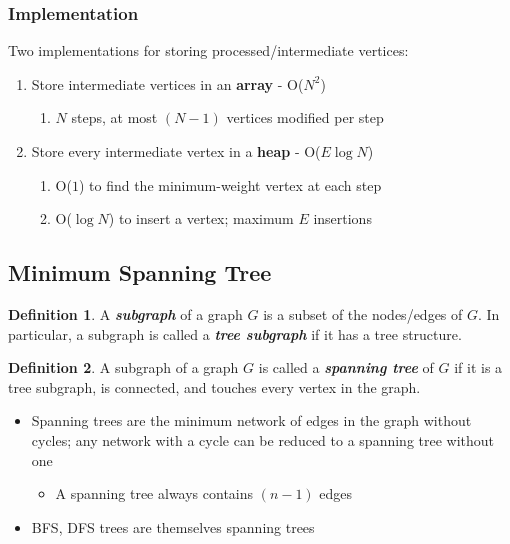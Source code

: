 \documentclass[12pt]{extarticle}
\theoremstyle{definition}
\newtheorem*{definition}{Definition}
\theoremstyle{remark}
\begin{document}
\subsubsection*{Implementation}
Two implementations for storing processed/intermediate vertices: \begin{enumerate}
    \item Store intermediate vertices in an \textbf{array} - O($N^2$) \begin{enumerate}
        \item $N$ steps, at most $(N-1)$ vertices modified per step
    \end{enumerate}
    \item Store every intermediate vertex in a \textbf{heap} - O($E\log N$) \begin{enumerate}
        \item O($1$) to find the minimum-weight vertex at each step
        \item O($\log N$) to insert a vertex; maximum $E$ insertions
    \end{enumerate}
\end{enumerate}

\pagebreak
\subsection{Minimum Spanning Tree}
\begin{definition}
    A \textbf{\textit{subgraph}} of a graph $G$ is a subset of the nodes/edges of $G$. In particular, a subgraph is called a \textit{\textbf{tree subgraph}} if it has a tree structure.
\end{definition}

\begin{center}
\end{center}

\begin{definition}
    A subgraph of a graph $G$ is called a \textbf{\textit{spanning tree}} of $G$ if it is a tree subgraph, is connected, and touches every vertex in the graph. \begin{itemize}
        \item Spanning trees are the minimum network of edges in the graph without cycles; any network with a cycle can be reduced to a spanning tree without one \begin{itemize}
            \item A spanning tree always contains $(n-1)$ edges
        \end{itemize}
        \item BFS, DFS trees are themselves spanning trees
    \end{itemize}
\end{definition}
\end{document}
